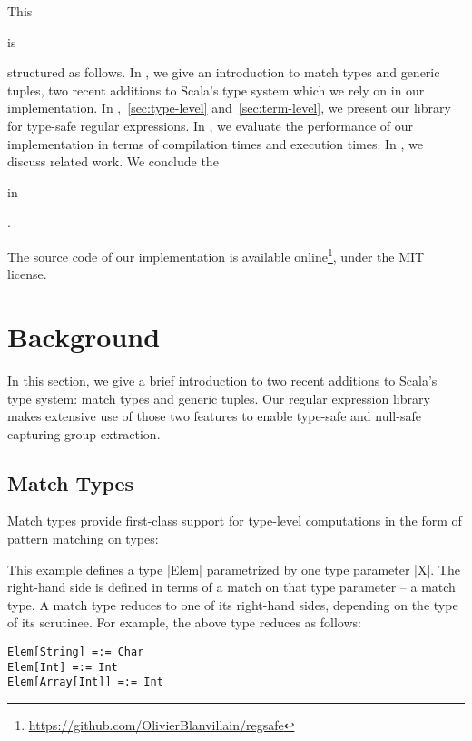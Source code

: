 This \begin{diff}\paper is\end{diff} structured as follows.
In , we give an introduction to match types and generic tuples, two recent additions to Scala's type system which we rely on in our implementation.
In ,~\ref{sec:type-level} and~\ref{sec:term-level}, we present our library for type-safe regular expressions.
In , we evaluate the performance of our implementation in terms of compilation times and execution times.
In , we discuss related work.
We conclude the \begin{diff}\paper in\end{diff} .

The source code of our implementation is available online\footnote{\url{https://github.com/OlivierBlanvillain/regsafe}}, under the MIT license.

\section{Background}
\label{sec:background}

In this section, we give a brief introduction to two recent additions to Scala's type system: match types and generic tuples.
Our regular expression library makes extensive use of those two features to enable type-safe and null-safe capturing group extraction.

\subsection{Match Types}

Match types provide first-class support for type-level computations in the form of pattern matching on types:

\elemExample

\noindent
This example defines a type |Elem| parametrized by one type parameter |X|.
The right-hand side is defined in terms of a match on that type parameter -- a match type.
A match type reduces to one of its right-hand sides, depending on the type of its scrutinee.
For example, the above type reduces as follows:

\begin{lstlisting}
Elem[String] =:= Char
Elem[Int] =:= Int
Elem[Array[Int]] =:= Int
\end{lstlisting}

